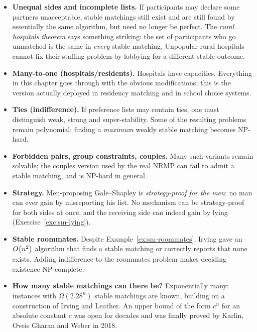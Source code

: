 \begin{itemize}
  \item \textbf{Unequal sides and incomplete lists.} If participants may
        declare some partners unacceptable, stable matchings still exist and
        are still found by essentially the same algorithm, but need no longer
        be perfect. The \emph{rural hospitals theorem} says something striking:
        the set of participants who go unmatched is the same in \emph{every}
        stable matching. Unpopular rural hospitals cannot fix their staffing
        problem by lobbying for a different stable outcome.
  \item \textbf{Many-to-one (hospitals/residents).} Hospitals have capacities.
        Everything in this chapter goes through with the obvious modifications;
        this is the version actually deployed in residency matching and in
        school choice systems.
  \item \textbf{Ties (indifference).} If preference lists may contain ties, one
        must distinguish weak, strong and super-stability. Some of the
        resulting problems remain polynomial; finding a \emph{maximum} weakly
        stable matching becomes NP-hard.
  \item \textbf{Forbidden pairs, group constraints, couples.} Many such
        variants remain solvable; the couples version used by the real NRMP
        can fail to admit a stable matching, and is NP-hard in general.
  \item \textbf{Strategy.} Men-proposing Gale--Shapley is
        \emph{strategy-proof for the men}: no man can ever gain by
        misreporting his list. No mechanism can be strategy-proof for both
        sides at once, and the receiving side can indeed gain by lying
        (Exercise~\ref{exc:sm-lying}).
  \item \textbf{Stable roommates.} Despite Example~\ref{ex:sm-roommates}, Irving
        gave an $O\!\left(n^2\right)$ algorithm that finds a stable matching or
        correctly reports that none exists. Adding indifference to the
        roommates problem makes deciding existence NP-complete.
  \item \textbf{How many stable matchings can there be?} Exponentially many:
        instances with $\Omega(2.28^n)$ stable matchings are known, building on
        a construction of Irving and Leather. An upper bound of the form $c^n$
        for an absolute constant $c$ was open for decades and was finally
        proved by Karlin, Oveis Gharan and Weber in 2018.
\end{itemize}


